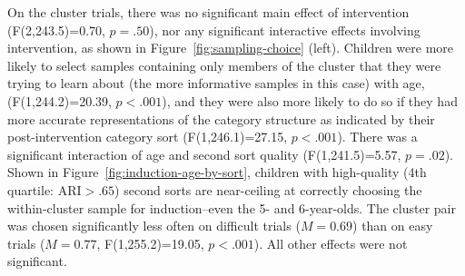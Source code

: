 \documentclass[10pt,letterpaper]{article}
\begin{document}
On the cluster trials, there was no significant main effect of intervention (F(2,243.5)=0.70, $p=.50$), nor any significant interactive effects involving intervention, as shown in Figure~\ref{fig:sampling-choice} (left).
Children were more likely to select samples containing only members of the cluster that they were trying to learn about (the more informative samples in this case) with age, (F(1,244.2)=20.39, $p<.001$), and they were also more likely to do so if they had more accurate representations of the category structure as indicated by their post-intervention category sort (F(1,246.1)=27.15, $p<.001$). 
There was a significant interaction of age and second sort quality (F(1,241.5)=5.57, $p=.02$).
Shown in Figure~\ref{fig:induction-age-by-sort}, children with high-quality (4th quartile: ARI$>.65$) second sorts are near-ceiling at correctly choosing the within-cluster sample for induction--even the 5- and 6-year-olds.
The cluster pair was chosen significantly less often on difficult trials ($M=0.69$) than on easy trials ($M=0.77$, F(1,255.2)=19.05, $p<.001$).
All other effects were not significant. 
\end{document}
